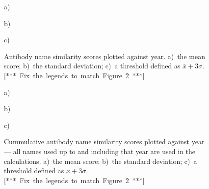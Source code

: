 \documentclass{article}
\newcommand{\note}[1]{\mbox{\color{red}[*** #1 ***]}}
\begin{document}
\begin{figure}
  \noindent a)

\begin{center}
\end{center}

  \noindent b)

\begin{center}
\end{center}

  \noindent c)

\begin{center}
\end{center}

  
  \caption{\label{fig:results} Antibody name similarity
    scores plotted against year. a)~the mean score; b)~the standard
    deviation; c)~a threshold defined as
    $\bar{x}+3\sigma$. \note{Fix the legends to match Figure~2}}
\end{figure}




\begin{figure}
  \noindent a)

\begin{center}
\end{center}

  \noindent b)

\begin{center}
\end{center}

  \noindent c)

\begin{center}
\end{center}

  
\caption{\label{fig:resultscumulative} Cummulative antibody name similarity
  scores plotted against year --- all names used up to and including
  that year are used in the calculations. a)~the mean score; b)~the
  standard deviation; c)~a threshold defined as
  $\bar{x}+3\sigma$. \note{Fix the legends to match Figure~2}}
\end{figure}
\end{document}
